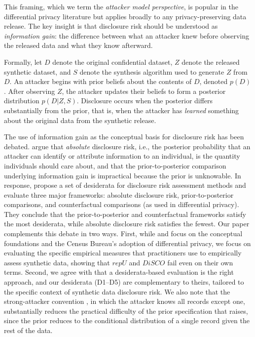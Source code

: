 \documentclass[Afour,sageh,times,doublespace]{sagej}
\begin{document}
This framing, which we term the \textit{attacker model perspective}, is popular in the differential privacy literature \citep{Dwork2006} but applies broadly to any privacy-preserving data release. The key insight is that disclosure risk should be understood as \textit{information gain}: the difference between what an attacker knew before observing the released data and what they know afterward.

Formally, let $D$ denote the original confidential dataset, $Z$ denote the released synthetic dataset, and $S$ denote the synthesis algorithm used to generate $Z$ from $D$. An attacker begins with prior beliefs about the contents of $D$, denoted $p(D)$. After observing $Z$, the attacker updates their beliefs to form a posterior distribution $p(D|Z, S)$. Disclosure occurs when the posterior differs substantially from the prior, that is, when the attacker has \textit{learned} something about the original data from the synthetic release.

The use of information gain as the conceptual basis for disclosure risk has been debated. \citet{Hotz2022} argue that \textit{absolute} disclosure risk, i.e., the posterior probability that an attacker can identify or attribute information to an individual, is the quantity individuals should care about, and that the prior-to-posterior comparison underlying information gain is impractical because the prior is unknowable. In response, \citet{Jarmin2023} propose a set of desiderata for disclosure risk assessment methods and evaluate three major frameworks: absolute disclosure risk, prior-to-posterior comparisons, and counterfactual comparisons (as used in differential privacy). They conclude that the prior-to-posterior and counterfactual frameworks satisfy the most desiderata, while absolute disclosure risk satisfies the fewest. Our paper complements this debate in two ways. First, while \citet{Hotz2022} and \citet{Jarmin2023} focus on the conceptual foundations and the Census Bureau's adoption of differential privacy, we focus on evaluating the specific empirical measures that practitioners use to empirically assess synthetic data, showing that $repU$ and $DiSCO$ fail even on their own terms. Second, we agree with \citet{Jarmin2023} that a desiderata-based evaluation is the right approach, and our desiderata (D1--D5) are complementary to theirs, tailored to the specific context of synthetic data disclosure risk. We also note that the strong-attacker convention \citep{reiter2014}, in which the attacker knows all records except one, substantially reduces the practical difficulty of the prior specification that \citet{Hotz2022} raises, since the prior reduces to the conditional distribution of a single record given the rest of the data.
\end{document}
